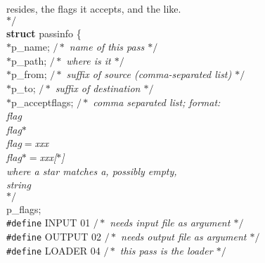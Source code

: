 \begin{flushleft}
{\hspace*{3\indentation}resides, the flags it accepts, and the like.\mbox{}\\
$\ast/$}\mbox{}\\
{\bf struct} passinfo \{\mbox{}\\
\hspace*{3\indentation}{\bf char} $\ast$p\_name;     {$/\ast$\it{} name of this pass $\ast/$}\mbox{}\\
\hspace*{3\indentation}{\bf char} $\ast$p\_path;     {$/\ast$\it{} where is it $\ast/$}\mbox{}\\
\hspace*{3\indentation}{\bf char} $\ast$p\_from;     {$/\ast$\it{} suffix of source (comma-separated list) $\ast/$}\mbox{}\\
\hspace*{3\indentation}{\bf char} $\ast$p\_to;    {$/\ast$\it{} suffix of destination $\ast/$}\mbox{}\\
\hspace*{3\indentation}{\bf char} $\ast$p\_acceptflags; {$/\ast$\it{} comma separated list; format:\mbox{}\\
\hspace*{18\indentation}flag\mbox{}\\
\hspace*{18\indentation}flag$\ast$\mbox{}\\
\hspace*{18\indentation}flag$=$xxx\mbox{}\\
\hspace*{15\indentation}flag$\ast$$=$xxx[$\ast$]\mbox{}\\
\hspace*{15\indentation}where a star matches a, possibly empty, \mbox{}\\
\hspace*{15\indentation}string\mbox{}\\
\hspace*{12\indentation}$\ast/$}\mbox{}\\
\hspace*{3\indentation}{\bf int}  p\_flags;\mbox{}\\
{\tt \#define} INPUT  01    {$/\ast$\it{} needs input file as argument $\ast/$}\mbox{}\\
{\tt \#define} OUTPUT 02    {$/\ast$\it{} needs output file as argument $\ast/$}\mbox{}\\
{\tt \#define} LOADER 04    {$/\ast$\it{} this pass is the loader $\ast/$}\mbox{}\\

\end{flushleft}
